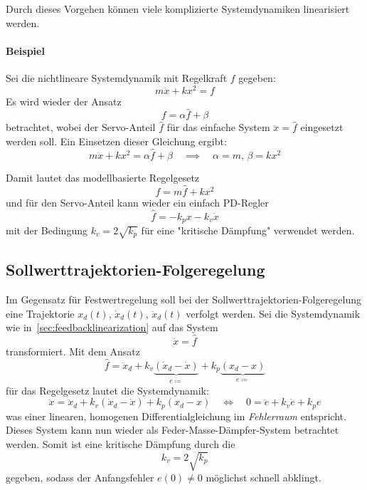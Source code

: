 			Durch dieses Vorgehen können viele komplizierte Systemdynamiken linearisiert werden.
			
			\paragraph{Beispiel}
				Sei die nichtlineare Systemdynamik mit Regelkraft \(f\) gegeben:
				\begin{equation*}
					m\ddot{x} + kx^2 = f
				\end{equation*}
				Es wird wieder der Ansatz
				\begin{equation*}
					f = \alpha \hat{f} + \beta
				\end{equation*}
				betrachtet, wobei der Servo-Anteil \( \hat{f} \) für das einfache System \( \ddot{x} = \hat{f} \) eingesetzt werden soll. Ein Einsetzen dieser Gleichung ergibt:
				\begin{equation*}
					m\ddot{x} + kx^2 = \alpha \hat{f} + \beta \quad\implies\quad \alpha = m,\, \beta = kx^2
				\end{equation*}
				
				Damit lautet das modellbasierte Regelgesetz
				\begin{equation*}
					f = m \hat{f} + kx^2
				\end{equation*}
				und für den Servo-Anteil kann wieder ein einfach PD-Regler
				\begin{equation*}
					\hat{f} = -k_p x - k_v \dot{x}
				\end{equation*}
				mit der Bedingung \( k_v = 2 \sqrt{k_p} \) für eine "kritische Dämpfung" verwendet werden.

		\subsection{Sollwerttrajektorien-Folgeregelung}
			Im Gegensatz für Festwertregelung soll bei der Sollwerttrajektorien-Folgeregelung eine Trajektorie \( x_d(t) \), \( \dot{x}_d(t) \), \( \ddot{x}_d(t) \) verfolgt werden. Sei die Systemdynamik wie in~\ref{sec:feedbacklinearization} auf das System
			\begin{equation*}
				\ddot{x} = \hat{f}
			\end{equation*}
			transformiert. Mit dem Ansatz
			\begin{equation*}
				\hat{f} = \ddot{x}_d + k_v \underbrace{(\dot{x}_d - \dot{x})}_{\dot{e} \coloneqq} + k_p \underbrace{(x_d - x)}_{e \coloneqq}
			\end{equation*}
			für das Regelgesetz lautet die Systemdynamik:
			\begin{equation*}
				\ddot{x} = \ddot{x}_d + k_v (\dot{x}_d - \dot{x}) + k_p (x_d - x) \quad\iff\quad 0 = \ddot{e} + k_v \dot{e} + k_p e
			\end{equation*}
			was einer linearen, homogenen Differentialgleichung im \emph{Fehlerraum} entspricht. Dieses System kann nun wieder als Feder-Masse-Dämpfer-System betrachtet werden. Somit ist \zB eine kritische Dämpfung durch die
			\begin{equation*}
				k_v = 2 \sqrt{k_p}
			\end{equation*}
			gegeben, sodass der Anfangsfehler \( e(0) \neq 0 \) möglichst schnell abklingt.

